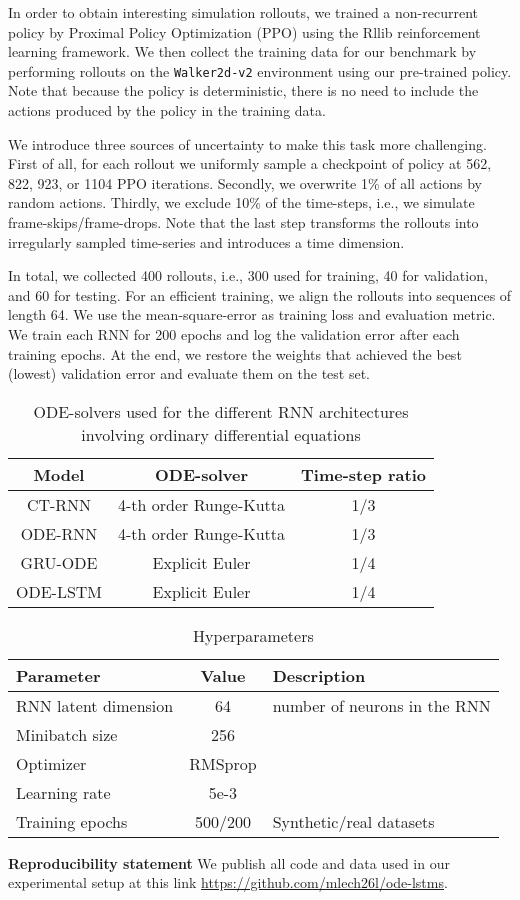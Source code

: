 \documentclass{article}
\begin{document}
In order to obtain interesting simulation rollouts, we trained a non-recurrent policy by Proximal Policy Optimization (PPO) \cite{schulman2017proximal} using the Rllib \cite{liang2018rllib} reinforcement learning framework. We then collect the training data for our benchmark by performing rollouts on the \texttt{Walker2d-v2} environment using our pre-trained policy. Note that because the policy is deterministic, there is no need to include the actions produced by the policy in the training data.

We introduce three sources of uncertainty to make this task more challenging.
First of all, for each rollout we uniformly sample a checkpoint of policy at 562, 822, 923, or 1104 PPO iterations.
Secondly, we overwrite 1\% of all actions by random actions.
Thirdly, we exclude 10\% of the time-steps, i.e., we simulate frame-skips/frame-drops. Note that the last step transforms the rollouts into irregularly sampled time-series and introduces a time dimension.

In total, we collected 400 rollouts, i.e., 300 used for training, 40 for validation, and 60 for testing. For an efficient training, we align the rollouts into sequences of length 64. We use the mean-square-error as training loss and evaluation metric. We train each RNN for 200 epochs and log the validation error after each training epochs. At the end, we restore the weights that achieved the best (lowest) validation error and evaluate them on the test set.


\begin{table}[]
    \centering
    \caption{ODE-solvers used for the different RNN architectures involving ordinary differential equations}
\begin{tabular}{ccc}
\toprule
Model & ODE-solver & Time-step ratio \\
\midrule
CT-RNN & 4-th order Runge-Kutta & 1/3 \\
ODE-RNN & 4-th order Runge-Kutta & 1/3 \\
GRU-ODE & Explicit Euler & 1/4 \\
ODE-LSTM & Explicit Euler & 1/4 \\
\bottomrule
\end{tabular}
    \label{tab:ode_solvers}
\end{table}

\begin{table}[]
    \centering
    \caption{Hyperparameters}
\begin{tabular}{lcl}
\toprule
Parameter & Value & Description \\
\midrule
RNN latent dimension & 64 & number of neurons in the RNN\\
Minibatch size & 256 & \\
Optimizer & RMSprop \cite{tieleman2012lecture} & \\
Learning rate & 5e-3 & \\
Training epochs & 500/200 & Synthetic/real datasets \\
\bottomrule
\end{tabular}
    \label{tab:hyperparams}
\end{table}

\textbf{Reproducibility statement}
We publish all code and data used in our experimental setup at this link \url{https://github.com/mlech26l/ode-lstms}.
\end{document}
